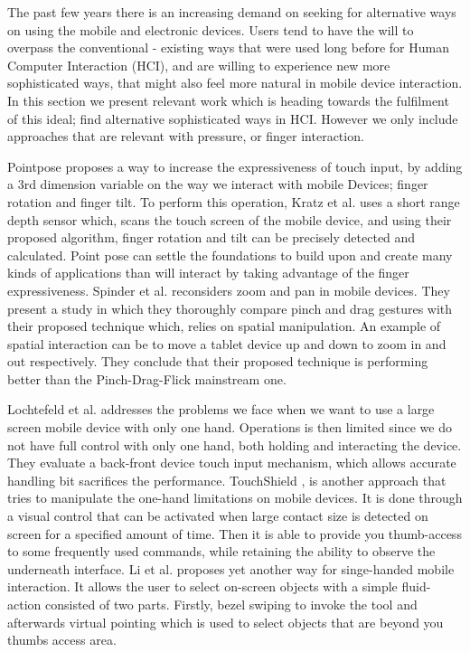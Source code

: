 The past few years there is an increasing demand on seeking for alternative ways on using the mobile and electronic devices. Users tend to have the will to overpass the conventional - existing ways that were used long before for Human Computer Interaction (HCI), and are willing to experience new more sophisticated ways, that might also feel more natural in mobile device interaction. In this section we present relevant work which is heading towards the fulfilment of this ideal; find alternative sophisticated ways in HCI. However we only include approaches that are relevant with pressure, or finger interaction.

Pointpose \cite{Kratz:2013:PFP:2512349.2512824} proposes a way to increase the expressiveness of touch input, by adding a 3rd dimension variable on the way we interact with mobile Devices; finger rotation and finger tilt. To perform this operation, Kratz et al. uses  a short range depth sensor which, scans the touch screen of the mobile device, and using their proposed algorithm, finger rotation and tilt can be precisely detected and calculated. Point pose can settle the foundations to build upon and create many kinds of applications than will interact by taking advantage of the finger expressiveness.
Spinder et al. \cite{Spindler:2014:PVS:2556288.2557028} reconsiders zoom and pan in mobile devices. They present a study in which they thoroughly compare pinch and drag gestures with their proposed technique which, relies on spatial manipulation. An example of spatial interaction can be to move a tablet device up and down to zoom in and out respectively. They conclude that their proposed technique is performing better than the Pinch-Drag-Flick mainstream one.

Lochtefeld et al. \cite{Lochtefeld:2013:EHF:2541831.2541865} addresses the problems we face when we want to use a large screen mobile device with only one hand. Operations is then limited since we do not have full control with only one hand, both holding and interacting the device. They evaluate a back-front device touch input mechanism, which allows accurate handling bit sacrifices the performance. 
TouchShield \cite{Hong:2013:TVC:2468356.2468589}, is another approach that tries to manipulate the one-hand limitations on mobile devices. It is done through a visual control that can be activated when large contact size is detected on screen for a specified amount of time. Then it is able to provide you thumb-access to some frequently used commands, while retaining the ability to observe the underneath interface. 
Li et al. \cite{Li:2013:BBC:2543651.2543680} proposes yet another way for singe-handed mobile interaction. It allows the user to select on-screen objects with a simple fluid-action consisted of two parts. Firstly, bezel swiping to invoke the tool and afterwards virtual pointing which is used to select objects that are beyond you thumbs access area.



